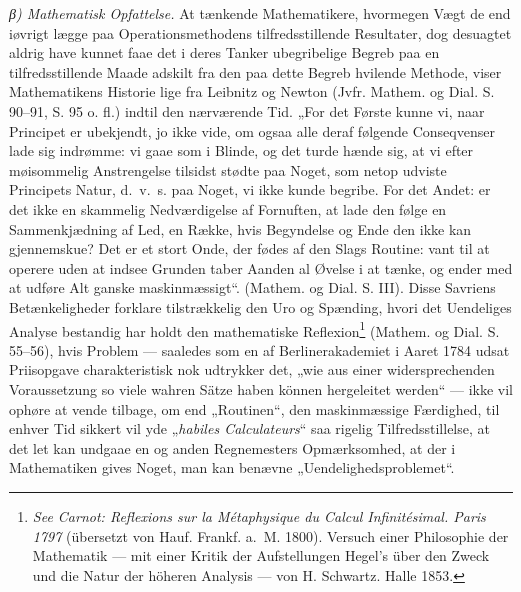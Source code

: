 \documentclass[12pt,a4paper]{book}
\begin{document}
\emph{β) Mathematisk Opfattelse.} At tænkende Mathematikere,
hvormegen Vægt de end iøvrigt lægge paa Operationsmethodens
tilfredsstillende Resultater, dog desuagtet aldrig
have kunnet faae det i deres Tanker ubegribelige Begreb paa
en tilfredsstillende Maade adskilt fra den paa dette Begreb
hvilende Methode, viser Mathematikens Historie lige fra
Leibnitz og Newton (Jvfr. Mathem. og Dial. S. 90--91,
S. 95 o. fl.) indtil den nærværende Tid. „For det Første
kunne vi, naar Principet er ubekjendt, jo ikke vide, om ogsaa
alle deraf følgende Conseqvenser lade sig indrømme: vi gaae
\setcounter{footnote}{0}
som i Blinde, og det turde hænde sig, at vi efter møisommelig
Anstrengelse tilsidst stødte paa Noget, som netop udviste
Principets Natur, d.~v.~s. paa Noget, vi ikke kunde begribe. For
det Andet: er det ikke en skammelig Nedværdigelse af Fornuften,
at lade den følge en Sammenkjædning af Led, en
Række, hvis Begyndelse og Ende den ikke kan gjennemskue?
Det er et stort Onde, der fødes af den Slags Routine:
vant til at operere uden at indsee Grunden taber Aanden al
Øvelse i at tænke, og ender med at udføre Alt ganske
maskinmæssigt“. (Mathem. og Dial. S. III). Disse Savriens
Betænkeligheder forklare tilstrækkelig den Uro og Spænding,
hvori det Uendeliges Analyse bestandig har holdt den mathematiske
Reflexion\footnote{\textit{See Carnot: Reflexions sur la
Métaphysique du Calcul Infinitésimal. Paris 1797} (übersetzt von
Hauf. Frankf. a.~M. 1800). Versuch einer Philosophie der Mathematik
--- mit einer Kritik der Aufstellungen Hegel's über den Zweck und die
Natur der höheren Analysis --- von H. Schwartz. Halle 1853.}
(Mathem. og Dial. S. 55--56), hvis Problem
--- saaledes som en af Berlinerakademiet i Aaret 1784 udsat
Priisopgave charakteristisk nok udtrykker det, „wie aus einer
widersprechenden Voraussetzung so viele wahren Sätze haben
können hergeleitet werden“ --- ikke vil ophøre at vende tilbage,
om end „Routinen“, den maskinmæssige Færdighed, til enhver
Tid sikkert vil yde „\textit{habiles Calculateurs}“ saa rigelig
Tilfredsstillelse, at det let kan undgaae en og anden Regnemesters
Opmærksomhed, at der i Mathematiken gives Noget, man kan
benævne „Uendelighedsproblemet“.
\end{document}
